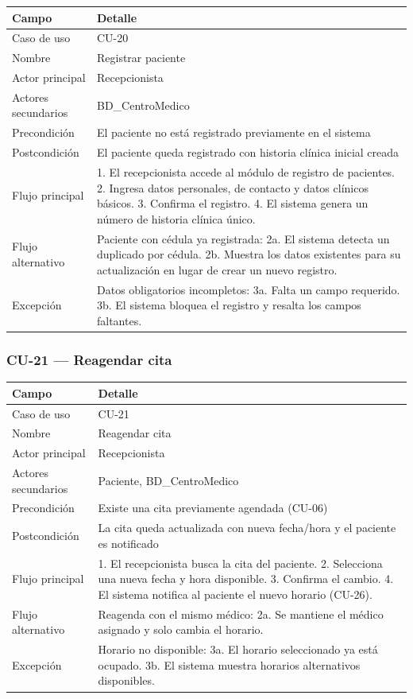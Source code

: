 \documentclass[11pt,a4paper]{article}
\begin{document}
	\begin{longtable}{p{} p{} }
		\toprule
		\textbf{Campo} & \textbf{Detalle} \\
		\midrule
		\endhead
		Caso de uso & CU-20 \\
		Nombre & Registrar paciente \\
		Actor principal & Recepcionista \\
		Actores secundarios & BD\_CentroMedico \\
		Precondición & El paciente no está registrado previamente en el sistema \\
		Postcondición & El paciente queda registrado con historia clínica inicial creada \\
		Flujo principal & 1. El recepcionista accede al módulo de registro de pacientes. 2. Ingresa datos personales, de contacto y datos clínicos básicos. 3. Confirma el registro. 4. El sistema genera un número de historia clínica único. \\
		Flujo alternativo & Paciente con cédula ya registrada: 2a. El sistema detecta un duplicado por cédula. 2b. Muestra los datos existentes para su actualización en lugar de crear un nuevo registro. \\
		Excepción & Datos obligatorios incompletos: 3a. Falta un campo requerido. 3b. El sistema bloquea el registro y resalta los campos faltantes. \\
		\bottomrule
	\end{longtable}
	
	\subsubsection{CU-21 --- Reagendar cita}
	
	\begin{longtable}{p{} p{} }
		\toprule
		\textbf{Campo} & \textbf{Detalle} \\
		\midrule
		\endhead
		Caso de uso & CU-21 \\
		Nombre & Reagendar cita \\
		Actor principal & Recepcionista \\
		Actores secundarios & Paciente, BD\_CentroMedico \\
		Precondición & Existe una cita previamente agendada (CU-06) \\
		Postcondición & La cita queda actualizada con nueva fecha/hora y el paciente es notificado \\
		Flujo principal & 1. El recepcionista busca la cita del paciente. 2. Selecciona una nueva fecha y hora disponible. 3. Confirma el cambio. 4. El sistema notifica al paciente el nuevo horario (CU-26). \\
		Flujo alternativo & Reagenda con el mismo médico: 2a. Se mantiene el médico asignado y solo cambia el horario. \\
		Excepción & Horario no disponible: 3a. El horario seleccionado ya está ocupado. 3b. El sistema muestra horarios alternativos disponibles. \\
		\bottomrule
	\end{longtable}
	
\end{document}
